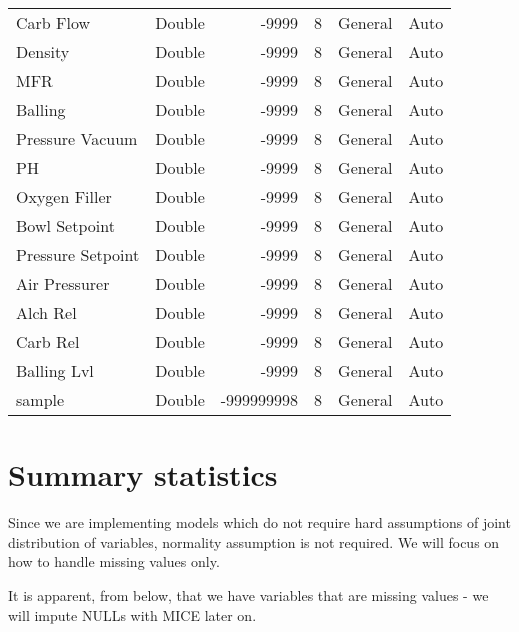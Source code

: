 \documentclass[]{report}
\begin{document}
\begin{table}[H]
\begin{tabular}[t]{llrrll}
Carb Flow & Double & -9999 & 8 & General & Auto\\
\rowcolor{gray!6}  Density & Double & -9999 & 8 & General & Auto\\
MFR & Double & -9999 & 8 & General & Auto\\
\rowcolor{gray!6}  Balling & Double & -9999 & 8 & General & Auto\\
\addlinespace
Pressure Vacuum & Double & -9999 & 8 & General & Auto\\
\rowcolor{gray!6}  PH & Double & -9999 & 8 & General & Auto\\
Oxygen Filler & Double & -9999 & 8 & General & Auto\\
\rowcolor{gray!6}  Bowl Setpoint & Double & -9999 & 8 & General & Auto\\
Pressure Setpoint & Double & -9999 & 8 & General & Auto\\
\addlinespace
\rowcolor{gray!6}  Air Pressurer & Double & -9999 & 8 & General & Auto\\
Alch Rel & Double & -9999 & 8 & General & Auto\\
\rowcolor{gray!6}  Carb Rel & Double & -9999 & 8 & General & Auto\\
Balling Lvl & Double & -9999 & 8 & General & Auto\\
\rowcolor{gray!6}  sample & Double & -999999998 & 8 & General & Auto\\
\bottomrule
\end{tabular}
\end{table}

\section{Summary statistics}\label{summary-statistics}

Since we are implementing models which do not require hard assumptions
of joint distribution of variables, normality assumption is not
required. We will focus on how to handle missing values only.

It is apparent, from below, that we have variables that are missing
values - we will impute NULLs with MICE later on.
\end{document}
